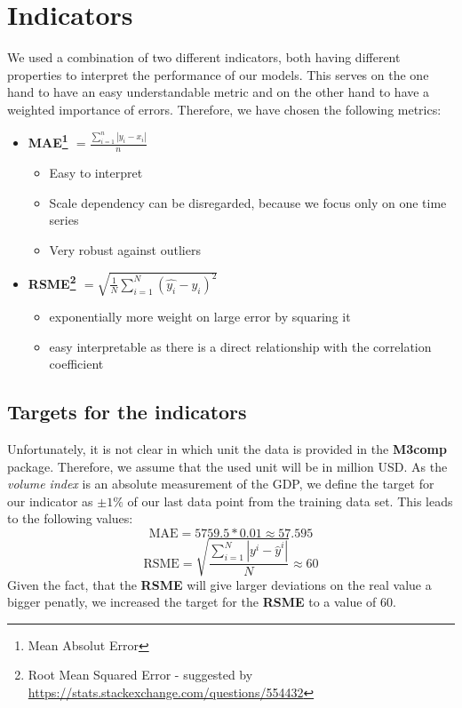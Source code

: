 \documentclass[10pt]{article}
\begin{document}
\section{Indicators}
We used a combination of two different indicators, both having different properties to interpret the performance of our models. This serves on the one hand to have an easy understandable metric and on the other hand to have a weighted importance of errors. Therefore, we have chosen the following metrics:
\begin{itemize}
    \item \textbf{MAE\footnote{Mean Absolut Error} $ = \frac{\sum _{i=1}^{n}\left|y_{i}-x_{i}\right|}{n}  $}
    \begin{itemize}
		\item Easy to interpret
		\item Scale dependency can be disregarded, because we focus only on one time series
		\item Very robust against outliers
	\end{itemize}
    \item \textbf{RSME\footnote{Root Mean Squared Error - suggested by \url{https://stats.stackexchange.com/questions/554432}} $ = \sqrt {\frac{1}{N} \sum_{i=1}^{N} (\hat{y_{i}} - y_{i})^2} $}
    \begin{itemize}
		\item exponentially more weight on large error by squaring it
		\item easy interpretable as there is a direct relationship with the correlation coefficient
	\end{itemize}
\end{itemize}

\subsection{Targets for the indicators}
Unfortunately, it is not clear in which unit the data is provided in the \textbf{M3comp} package. Therefore, we assume that the used unit will be in million USD. As the \textit{volume index} is an absolute measurement of the GDP, we define the target for our indicator as $\pm 1\%$ of our last data point from the training data set. This leads to the following values:
$$\text{MAE} = 5759.5 * 0.01 \approx 57.595 $$
$$\text{RSME} = \sqrt{\frac{\sum^{N}_{i = 1} \left| y^i - \hat{y}^i \right|}{N}} \approx 60 $$
Given the fact, that the \textbf{RSME} will give larger deviations on the real value a bigger penatly, we increased the target for the \textbf{RSME} to a value of 60.
\end{document}
